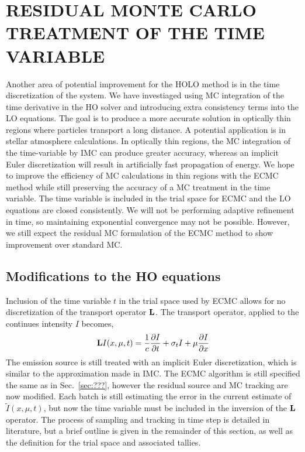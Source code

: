 
\chapter{ \uppercase {Residual Monte Carlo Treatment of the Time Variable}}
\label{sec:time}
Another area of potential improvement for the HOLO method is in the time discretization
of the system.  We have investiaged using MC integration of the time derivative in the HO
solver and introducing extra consistency terms into the LO equations.  The goal is to produce a more accurate solution in optically
thin regions where particles transport a long distance.  A potential application is in 
stellar atmosphere calculations.  In optically thin regions, the MC
integration of the time-variable by IMC can produce greater accuracy, whereas an implicit
Euler discretization will result in artificially fast propagation of energy.  We hope to improve
the efficiency of MC calculations in thin regions with the ECMC method while still preserving the
accuracy of a MC treatment in the time variable.  The time variable is included in
the trial space for ECMC and the LO equations are closed consistently.  We
will not be performing adaptive refinement in time, so maintaining exponential convergence
may not be possible.  However, we still expect the residual MC formulation of the ECMC method
to show improvement over standard MC.

\section{Modifications to the HO equations}
\label{sec:time_ho}

Inclusion of the time variable $t$ in the trial space used by ECMC allows for no discretization of the
transport operator $\mathbf{L}$.  The transport operator, applied to the continues intensity $I$
becomes,
\begin{equation}
   \mathbf{L}I(x,\mu,t) = \frac{1}{c}\frac{\partial I}{\partial t} + \sigma_t I + \mu \frac{\partial I}{\partial x}
\end{equation}
The emission source is still treated with an implicit Euler discretization, which is
similar to the approximation made in IMC.  The ECMC algorithm is still specified the same as in Sec.~\ref{sec:???}, however the residual
source and MC tracking are now modified.   Each batch is still estimating the error in the
current estimate of $\tilde I(x,\mu,t)$, but now the time variable must be included in the inversion of the $\mathbf{L}$
operator.  The process of sampling and tracking in time
step is detailed in literature\cite{wollaber_review,fnc,wollaber_thesis,cj_thesis}, but a
brief outline is given in the remainder of this section, as well as the definition for the
trial space and associated tallies. 

